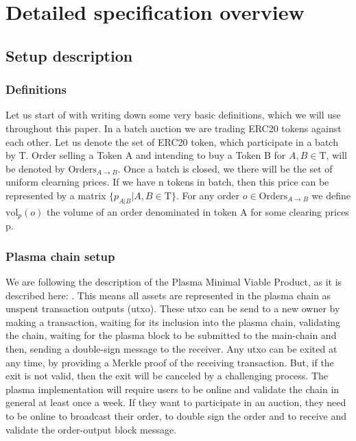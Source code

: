 \documentclass[11pt,parskip=full]{scrartcl}%
\newcommand{\Tau}{\mathrm{T}}
\begin{document}
\newpage

\section{Detailed specification overview}
\subsection{Setup description}

\subsubsection{Definitions}
Let us start of with writing down some very basic definitions, which we will use throughout this paper.
In a batch auction we are trading ERC20 tokens against each other. Let us denote the set of ERC20 token, which participate in a batch by $\Tau$. \newline
Order selling a Token A and intending to buy a Token B for $A,B\in \Tau$, will be denoted by $\text{Orders}_{A\rightarrow B}$. \newline
Once a batch is closed, we there will be the set of uniform clearning prices. If we have n tokens in batch, then this price can be represented by a matrix $\{p_{A|B}| A,B \in \Tau \}$. \newline
For any order $o \in \text{Orders}_{A\rightarrow B}$ we define $\text{vol}_p(o)$ the volume of an order denominated in token A for some clearing prices p.

\subsubsection{Plasma chain setup}
We are following the description of the Plasma Minimal Viable Product, as it is described here: \cite{MVP}. This means all assets are represented in the plasma chain as unspent transaction outputs (utxo). These utxo can be send to a new owner by making a transaction, waiting for its inclusion into the plasma chain, validating the chain, waiting for the plasma block to be submitted to the main-chain and then, sending a double-sign message to the receiver.
Any utxo can be exited at any time, by providing a Merkle proof of the receiving transaction. But, if the exit is not valid, then the exit will be canceled by a challenging process.
The plasma implementation will require users to be online and validate the chain in general at least once a week. If they want to participate in an auction, they need to be online to broadcast their order, to double sign the order and to receive and validate the order-output block message.
\end{document}
